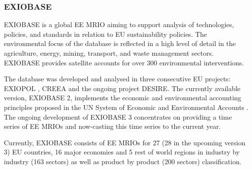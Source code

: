 \subsubsection{EXIOBASE}


EXIOBASE is a global EE MRIO aiming to support analysis of technologies,
policies, and standards in relation to EU sustainability policies. The
environmental focus of the database is reflected in a high level of detail in the
agriculture, energy, mining, transport, and waste management sectors. EXIOBASE provides satellite accounts for over 300 environmental
interventions.  

The database was developed and analysed in three consecutive EU projects: EXIOPOL \cite{Tukker_2013}, CREEA \cite{Wood_2014} and the ongoing project DESIRE. The currently available version, EXIOBASE 2, implements the
economic and environmental accounting principles proposed in the UN System of
Economic and Environmental Accounts \cite{european_commission_system_2014}.
The ongoing development of EXIOBASE 3 concentrates on providing a time series
of EE MRIOs and now-casting this time series to the current year. 

Currently, EXIOBASE consists of EE MRIOs for 27 (28 in the upcoming version 3) EU countries, 16 major economies and 5 rest of world regions in industry by industry (163 sectors) as well as
product by product (200 sectors) classification.